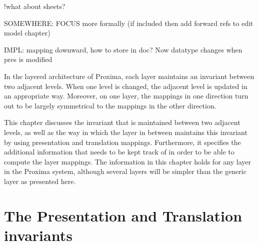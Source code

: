 !what about sheets? 

SOMEWHERE: FOCUS more formally (if included then add forward refs to edit model chapter)


IMPL: mapping downward, how to store in doc? Now datatype changes when pres is modified

\ec



In the layered architecture of Proxima, each layer maintains an invariant between two adjacent levels. When one level is changed, the adjacent level is updated in an appropriate way. Moreover, on one layer, the mappings in one direction turn out to be largely symmetrical to the mappings in the other direction.

This chapter discusses the invariant that is maintained between two adjacent levels, as well as the way in which the layer in between maintains this invariant by using presentation and translation mappings. Furthermore, it specifies the additional information that needs to be kept track of in order to be able to compute the layer mappings. The information in this chapter holds for any layer in the Proxima system, although several layers will be simpler than the generic layer as presented here.





%								
%								
%								
\section{The Presentation and Translation invariants}

